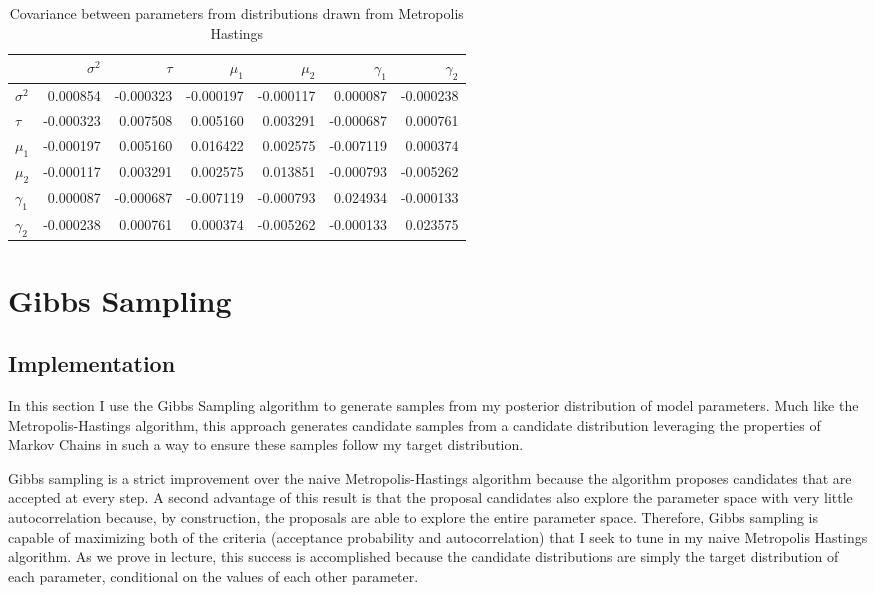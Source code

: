 \documentclass{article}
\begin{document}
\begin{table}[H]
  \begin{center}
    \begin{tabular}{lrrrrrr}
      {} & $\sigma^2$ & $\tau$ & $\mu_1$ & $\mu_2$ & $\gamma_1$ & $\gamma_2$ \\
      \midrule
      $\sigma^2$   &  0.000854 & -0.000323 & -0.000197 & -0.000117 &  0.000087 & -0.000238 \\
      $\tau$  & -0.000323 &  0.007508 &  0.005160 &  0.003291 & -0.000687 &  0.000761 \\
      $\mu_1$  & -0.000197 &  0.005160 &  0.016422 &  0.002575 & -0.007119 &  0.000374 \\
      $\mu_2$  & -0.000117 &  0.003291 &  0.002575 &  0.013851 & -0.000793 & -0.005262 \\
      $\gamma_1$ &  0.000087 & -0.000687 & -0.007119 & -0.000793 &  0.024934 & -0.000133 \\
      $\gamma_2$ & -0.000238 &  0.000761 &  0.000374 & -0.005262 & -0.000133 &  0.023575 \\
      \bottomrule
      \end{tabular}
  \end{center}
  \caption{\label{tab:mh_covar} Covariance between parameters from distributions drawn from Metropolis Hastings}
\end{table}













\section{Gibbs Sampling}
\subsection{Implementation}
In this section I use the Gibbs Sampling algorithm to generate samples from my posterior distribution of model parameters. Much like the Metropolis-Hastings algorithm, this approach generates candidate samples from a candidate distribution leveraging the properties of Markov Chains in such a way to ensure these samples follow my target distribution. 

Gibbs sampling is a strict improvement over the naive Metropolis-Hastings algorithm because the algorithm proposes candidates that are accepted at every step. A second advantage of this result is that the proposal candidates also explore the parameter space with very little autocorrelation because, by construction, the proposals are able to explore the entire parameter space. Therefore, Gibbs sampling is capable of maximizing both of the criteria (acceptance probability and autocorrelation) that I seek to tune in my naive Metropolis Hastings algorithm. As we prove in lecture, this success is accomplished because the candidate distributions are simply the target distribution of each parameter, conditional on the values of each other parameter. 
\end{document}

